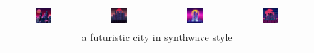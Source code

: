 \begin{figure}[ht!]
\begin{tabular}{cccc}
        \includegraphics[width=0.24\textwidth]{figures/cross/synthwave_0.jpg} &
        \includegraphics[width=0.24\textwidth]{figures/cross/synthwave_1.jpg} &
        \includegraphics[width=0.24\textwidth]{figures/cross/synthwave_2.jpg} &
        \includegraphics[width=0.24\textwidth]{figures/cross/synthwave_3.jpg} \vspace{-1mm}\\
        \multicolumn{4}{c}{\small a futuristic city in synthwave style}\\
        

\end{tabular}
\end{figure}
